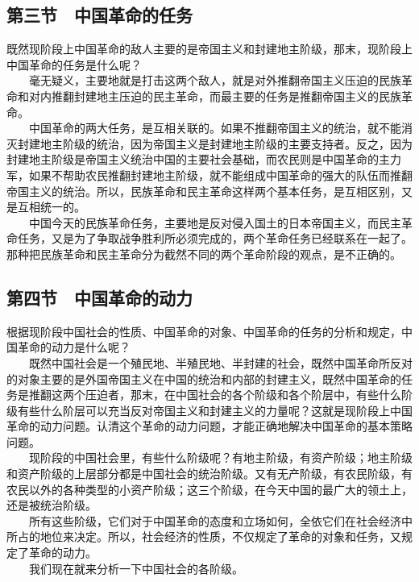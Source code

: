 \documentclass[cn,11pt,chinese]{elegantbook}
\def\myformat#1{\hfil\hfil #1}
\begin{document}
\subsection*{\myformat{第三节　中国革命的任务}}
既然现阶段上中国革命的敌人主要的是帝国主义和封建地主阶级，那末，现阶段上中国革命的任务是什么呢？\\
　　毫无疑义，主要地就是打击这两个敌人，就是对外推翻帝国主义压迫的民族革命和对内推翻封建地主压迫的民主革命，而最主要的任务是推翻帝国主义的民族革命。\\
　　中国革命的两大任务，是互相关联的。如果不推翻帝国主义的统治，就不能消灭封建地主阶级的统治，因为帝国主义是封建地主阶级的主要支持者。反之，因为封建地主阶级是帝国主义统治中国的主要社会基础，而农民则是中国革命的主力军，如果不帮助农民推翻封建地主阶级，就不能组成中国革命的强大的队伍而推翻帝国主义的统治。所以，民族革命和民主革命这样两个基本任务，是互相区别，又是互相统一的。\\
　　中国今天的民族革命任务，主要地是反对侵入国土的日本帝国主义，而民主革命任务，又是为了争取战争胜利所必须完成的，两个革命任务已经联系在一起了。那种把民族革命和民主革命分为截然不同的两个革命阶段的观点，是不正确的。\\
\subsection*{\myformat{第四节　中国革命的动力}}
根据现阶段中国社会的性质、中国革命的对象、中国革命的任务的分析和规定，中国革命的动力是什么呢？\\
　　既然中国社会是一个殖民地、半殖民地、半封建的社会，既然中国革命所反对的对象主要的是外国帝国主义在中国的统治和内部的封建主义，既然中国革命的任务是推翻这两个压迫者，那末，在中国社会的各个阶级和各个阶层中，有些什么阶级有些什么阶层可以充当反对帝国主义和封建主义的力量呢？这就是现阶段上中国革命的动力问题。认清这个革命的动力问题，才能正确地解决中国革命的基本策略问题。\\
　　现阶段的中国社会里，有些什么阶级呢？有地主阶级，有资产阶级；地主阶级和资产阶级的上层部分都是中国社会的统治阶级。又有无产阶级，有农民阶级，有农民以外的各种类型的小资产阶级；这三个阶级，在今天中国的最广大的领土上，还是被统治阶级。\\
　　所有这些阶级，它们对于中国革命的态度和立场如何，全依它们在社会经济中所占的地位来决定。所以，社会经济的性质，不仅规定了革命的对象和任务，又规定了革命的动力。\\
　　我们现在就来分析一下中国社会的各阶级。\\
\end{document}
